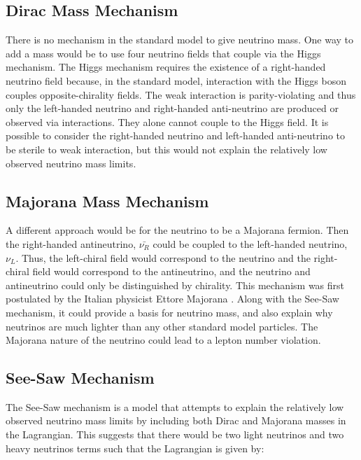 \subsection{Dirac Mass Mechanism}
There is no mechanism in the standard model to give neutrino mass. One way to add a mass would be to use four neutrino fields that couple via the Higgs mechanism. The Higgs mechanism requires the existence of a right-handed neutrino field because, in the standard model, interaction with the Higgs boson couples opposite-chirality fields. The weak interaction is parity-violating and thus only the left-handed neutrino and right-handed anti-neutrino are produced or observed via interactions. They alone cannot couple to the Higgs field. It is possible to consider the right-handed neutrino and left-handed anti-neutrino to be sterile to weak interaction, but this would not explain the relatively low observed neutrino mass limits.

\subsection{Majorana Mass Mechanism}
A different approach would be for the neutrino to be a Majorana fermion. Then the right-handed antineutrino, $\bar{\nu_R}$ could be coupled to the left-handed neutrino, $\nu_L$. Thus, the left-chiral field would correspond to the neutrino and the right-chiral field would correspond to the antineutrino, and the neutrino and antineutrino could only be distinguished by chirality. This mechanism was first postulated by the Italian physicist Ettore Majorana \cite{Majorana_1937}. Along with the See-Saw mechanism, it could provide a basis for neutrino mass, and also explain why neutrinos are much lighter than any other standard model particles. The Majorana nature of the neutrino could lead to a lepton number violation.


\subsection{See-Saw Mechanism}
The See-Saw mechanism is a model that attempts to explain the relatively low observed neutrino mass limits by including both Dirac and Majorana masses in the Lagrangian. This suggests that there would be two light neutrinos and two heavy neutrinos terms such that the Lagrangian is given by:



